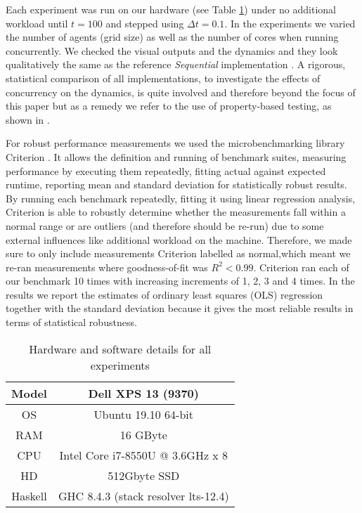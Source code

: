 Each experiment was run on our hardware (see Table \ref{tab:machine_specs}) under no additional workload until $t = 100$ and stepped using $\Delta t = 0.1$. In the experiments we varied the number of agents (grid size) as well as the number of cores when running concurrently. We checked the visual outputs and the dynamics and they look qualitatively the same as the reference \textit{Sequential} implementation \cite{thaler_pure_2018}. A rigorous, statistical comparison of all implementations, to investigate the effects of concurrency on the dynamics, is quite involved and therefore beyond the focus of this paper but as a remedy we refer to the use of property-based testing, as shown in \cite{thaler_show_2019}.

For robust performance measurements we used the microbenchmarking library Criterion \cite{criterion_serpentine, criterion_hackage}. It allows the definition and running of benchmark suites, measuring performance by executing them repeatedly, fitting actual against expected runtime, reporting mean and standard deviation for statistically robust results. By running each benchmark repeatedly, fitting it using linear regression analysis, Criterion is able to robustly determine whether the measurements fall within a normal range or are outliers (and therefore should be re-run) due to some external influences like additional workload on the machine. Therefore, we made sure to only include measurements Criterion labelled as normal,which meant we re-ran measurements where goodness-of-fit was $R^2 < 0.99$. Criterion ran each of our benchmark 10 times with increasing increments of 1, 2, 3 and 4 times. In the results we report the estimates of ordinary least squares (OLS) regression together with the standard deviation because it gives the most reliable results in terms of statistical robustness. 


\begin{table}
	\centering
	\begin{tabular}{ c || c }
		Model   & Dell XPS 13 (9370)				    \\ \hline
		OS      & Ubuntu 19.10 64-bit 				\\ \hline
		RAM     & 16 GByte 							\\ \hline
		CPU     & Intel Core i7-8550U @ 3.6GHz x 8 	\\ \hline
		HD      & 512Gbyte SSD 						\\ \hline
		Haskell & GHC 8.4.3 (stack resolver lts-12.4)
	\end{tabular}
	
	\caption{Hardware and software details for all experiments}
	\label{tab:machine_specs}
\end{table}

